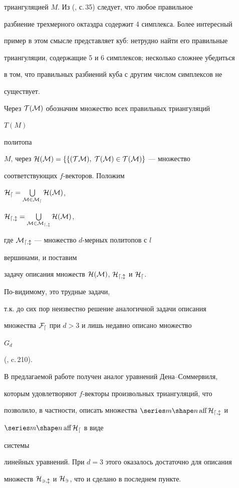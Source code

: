 триангуляцией $M$. Из (\cite{S1}, с.\,35) следует, что любое правильное


разбиение трехмерного октаэдра содержит 4 симплекса. Более интересный


пример в этом смысле представляет куб: нетрудно найти его правильные


триангуляции, содержащие 5 и 6 симплексов; несколько сложнее убедиться


в том, что правильных разбиений куба с другим числом симплексов не


существует.





Через $\cal T(M)$ обозначим множество всех правильных триангуляций


$T(M)$


политопа


$M$, через $\cal H(M)=\{f(TM),\;T(M)\in\cal T(M)\}$ --- множество


соответствующих $f$-векторов. Положим


$\cal H_d=\bigcup\limits_{M\in\cal M_d}\cal H(M)$,


$\cal H_{d,l}=\bigcup\limits_{M\in\cal M_{d,l}}\cal H(M)$,


где $\cal M_{d,l}$ --- множество $d$-мерных политопов с $l$


вершинами, и поставим


задачу описания множеств $\cal H(M)$, $\cal H_{d,l}$ и $\cal H_d$.


По-видимому, это трудные задачи,


т.к. до сих пор неизвестно решение аналогичной задачи описания


множества $\cal F_d$ при $d>3$ и лишь недавно описано множество


$G_d$


(\cite{Bre}, c.\,210).





В предлагаемой работе получен аналог уравнений Дена--Соммервиля,


которым удовлетворяют $f$-векторы произвольных триангуляций, что


позволило, в частности, описать множества $\aff\cal H_{d,l}$ и


$\aff \cal H_d$ в виде


системы


линейных уравнений. При $d=3$ этого оказалось достаточно для описания


множеств $\cal H_{3,l}$ и $\cal H_3$, что и сделано в последнем пункте.


